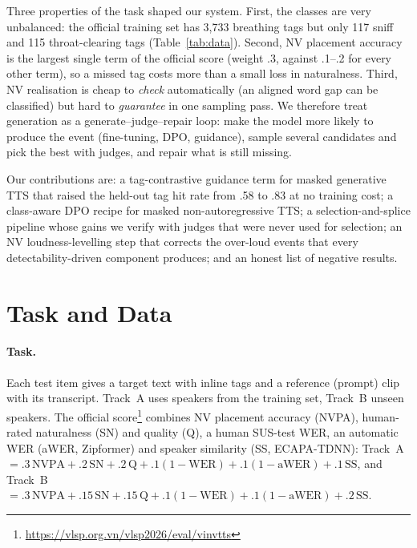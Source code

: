 \documentclass[11pt]{article}
\begin{document}
Three properties of the task shaped our system. First, the classes are very unbalanced: the official training set has
3{,}733 breathing tags but only 117 sniff and 115 throat-clearing tags (Table~\ref{tab:data}). Second, NV placement accuracy
is the largest single term of the official score (weight .3, against .1--.2 for every other term), so a missed tag
costs more than a small loss in naturalness. Third, NV realisation is cheap to \emph{check} automatically
(an aligned word gap can be classified) but hard to \emph{guarantee} in one sampling pass. We therefore treat generation
as a generate--judge--repair loop: make the model more likely to produce the event (fine-tuning, DPO, guidance), sample
several candidates and pick the best with judges, and repair what is still missing.

Our contributions are: a tag-contrastive guidance term for masked generative TTS that raised the held-out tag hit rate
from .58 to .83 at no training cost; a class-aware DPO recipe for masked non-autoregressive TTS; a selection-and-splice
pipeline whose gains we verify with judges that were never used for selection; an NV loudness-levelling step that
corrects the over-loud events that every detectability-driven component produces; and an honest list of negative
results.

\section{Task and Data}

\paragraph{Task.} Each test item gives a target text with inline tags and a reference (prompt) clip with its transcript.
Track~A uses speakers from the training set, Track~B unseen speakers. The official score\footnote{\url{https://vlsp.org.vn/vlsp2026/eval/vinvtts}}
combines NV placement accuracy (NVPA), human-rated naturalness (SN) and quality (Q), a human SUS-test WER, an automatic
WER (aWER, Zipformer) and speaker similarity (SS, ECAPA-TDNN): Track~A $= .3\,\mathrm{NVPA} + .2\,\mathrm{SN} +
.2\,\mathrm{Q} + .1(1{-}\mathrm{WER}) + .1(1{-}\mathrm{aWER}) + .1\,\mathrm{SS}$, and Track~B $= .3\,\mathrm{NVPA} +
.15\,\mathrm{SN} + .15\,\mathrm{Q} + .1(1{-}\mathrm{WER}) + .1(1{-}\mathrm{aWER}) + .2\,\mathrm{SS}$.
\end{document}
